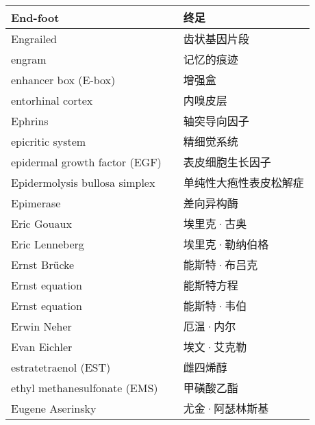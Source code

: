 \begin{longtable}{lll}
	\midrule
	End-foot     &&  终足  \\
	
	\midrule
	Engrailed     &&  齿状基因片段  \\
	
	\midrule
	engram     &&  记忆的痕迹  \\
	
	\midrule
	enhancer box (E-box)    &&  增强盒  \\
	
	\midrule
	entorhinal cortex     &&  内嗅皮层  \\
	
	\midrule
	Ephrins     &&  轴突导向因子  \\
	
	\midrule
	epicritic system     &&  精细觉系统  \\
	
	\midrule
	epidermal growth factor (EGF)    &&  表皮细胞生长因子  \\
	
	\midrule
	Epidermolysis bullosa simplex    &&  单纯性大疱性表皮松解症  \\
	
	\midrule
	Epimerase    &&  差向异构酶  \\
	
	\midrule
	Eric Gouaux    &&  埃里克·古奥  \\
	
	\midrule
	Eric Lenneberg    &&  埃里克·勒纳伯格  \\
	
	\midrule
	Ernst Brücke    &&  能斯特·布吕克  \\
	
	\midrule
	Ernst equation    &&  能斯特方程  \\
	
	\midrule
	Ernst equation    &&  能斯特·韦伯  \\
	
	\midrule
	Erwin Neher    &&  厄温·内尔  \\
	
	\midrule
	Evan Eichler    &&  埃文·艾克勒  \\
	
	\midrule
	estratetraenol (EST)   &&  雌四烯醇  \\
	
	\midrule
	ethyl methanesulfonate (EMS)    &&  甲磺酸乙酯  \\
	
	\midrule
	Eugene Aserinsky    &&  尤金·阿瑟林斯基  \\
	

\end{longtable}

